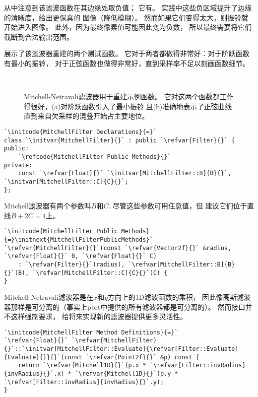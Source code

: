 从中注意到该滤波函数在其边缘处取负值；
它有。
实践中这些负区域提升了边缘的清晰度，给出更保真的
图像（降低模糊）。
然而如果它们变得太大，则振铃就开始进入图像。
此外，因为最终像素值可能因此变为负数，
所以最终需要将它们截断到合法输出范围。

展示了该滤波器重建的两个测试函数。
它对于两者都做得非常好：对于阶跃函数有最小的振铃，
对于正弦函数也做得非常好，直到采样率不足以刻画函数细节。
\begin{figure}[htbp]
    \centering
    \,
    \caption{Mitchell-Netravali滤波器用于重建示例函数。
        它对这两个函数都工作得很好，(a)对阶跃函数引入了最小振铃
        且(b)准确地表示了正弦曲线直到来自欠采样的混叠开始占主要地位。}
    \label{fig:7.44}
\end{figure}

\begin{lstlisting}
`\initcode{MitchellFilter Declarations}{=}`
class `\initvar{MitchellFilter}{}` : public `\refvar{Filter}{}` {
public:
    `\refcode{MitchellFilter Public Methods}{}`
private:
    const `\refvar{Float}{}` `\initvar[MitchellFilter::B]{B}{}`, `\initvar[MitchellFilter::C]{C}{}`;
};
\end{lstlisting}

Mitchell滤波器有两个参数叫$B$和$C$.
尽管这些参数可用任意值，但\citeauthor{10.1145/54852.378514}
建议它们位于直线$B+2C=1$上。
\begin{lstlisting}
`\initcode{MitchellFilter Public Methods}{=}\initnext{MitchellFilterPublicMethods}`
`\refvar{MitchellFilter}{}`(const `\refvar{Vector2f}{}` &radius, `\refvar{Float}{}` B, `\refvar{Float}{}` C)
    : `\refvar{Filter}{}`(radius), `\refvar[MitchellFilter::B]{B}{}`(B), `\refvar[MitchellFilter::C]{C}{}`(C) {
}
\end{lstlisting}

Mitchell-Netravali滤波器是在$x$和$y$方向上的1D滤波函数的乘积，
因此像高斯滤波器那样是可分离的（事实上pbrt中提供的所有滤波器都是可分离的）。
然而接口并不这样强制要求，
给将来实现新的滤波器提供更多灵活性。
\begin{lstlisting}
`\initcode{MitchellFilter Method Definitions}{=}`
`\refvar{Float}{}` `\refvar{MitchellFilter}{}`::`\initvar[MitchellFilter::Evaluate]{\refvar[Filter::Evaluate]{Evaluate}{}}{}`(const `\refvar{Point2f}{}` &p) const {
    return `\refvar{Mitchell1D}{}`(p.x * `\refvar[Filter::invRadius]{invRadius}{}`.x) * `\refvar{Mitchell1D}{}`(p.y * `\refvar[Filter::invRadius]{invRadius}{}`.y);
}
\end{lstlisting}

